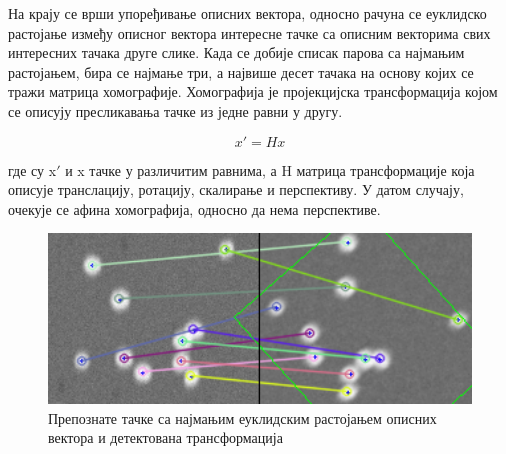 \documentclass[12pt,a4paper,serbian,oneside]{book}
\begin{document}
На крају се врши упоређивање описних вектора, односно рачуна се еуклидско растојање између описног вектора интересне тачке са описним векторима свих интересних тачака друге слике.  Када се добије списак парова са најмањим растојањем, бира се најмање три, а највише десет тачака на основу којих се тражи матрица хомографије. Хомографија је пројекцијска трансформација којом се описују пресликавања тачке из једне равни у другу.

 \begin{equation}
x \prime = H x
\end{equation}

где су x$\prime$ и x тачке у различитим равнима, а H матрица трансформације која описује транслацију, ротацију, скалирање и перспективу. У датом случају, очекује се афина хомографија, односно да нема перспективе.

\begin{figure}[h]
\begin{center}
\includegraphics[width=150mm]{images/rotation.png}
\end{center}
\caption{Препознате тачке са најмањим еуклидским растојањем описних вектора и детектована трансформација}
\label{fig:rotation}
\end{figure}
\end{document}
